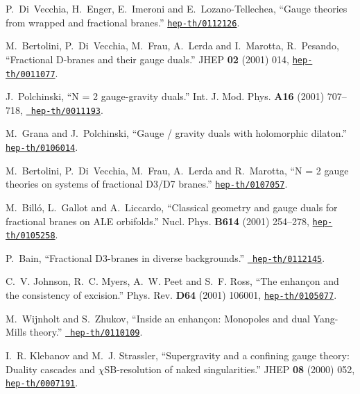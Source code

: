 \documentclass[a4paper,11pt]{article}
\begin{document}
\begin{thebibliography}{10}
P.~Di~Vecchia, H.~Enger, E.~Imeroni and E.~Lozano-Tellechea, ``Gauge theories
  from wrapped and fractional branes.''
  \href{http://xxx.lanl.gov/abs/hep-th/0112126}{{\tt hep-th/0112126}}.

M.~Bertolini, P.~Di~Vecchia, M.~Frau, A.~Lerda and I.~Marotta, R.~Pesando,
  ``Fractional D-branes and their gauge duals.'' JHEP {\bf 02} (2001) 014,
  \href{http://xxx.lanl.gov/abs/hep-th/0011077}{{\tt hep-th/0011077}}.

J.~Polchinski, ``N = 2 gauge-gravity duals.'' Int. J. Mod. Phys. {\bf A16}
  (2001) 707--718, \href{http://xxx.lanl.gov/abs/hep-th/0011193}{{\tt
  hep-th/0011193}}. %

M.~Grana and J.~Polchinski, ``Gauge / gravity duals with holomorphic dilaton.''
  \href{http://xxx.lanl.gov/abs/hep-th/0106014}{{\tt hep-th/0106014}}.

M.~Bertolini, P.~Di~Vecchia, M.~Frau, A.~Lerda and R.~Marotta, ``N = 2 gauge
  theories on systems of fractional D3/D7 branes.''
  \href{http://xxx.lanl.gov/abs/hep-th/0107057}{{\tt hep-th/0107057}}.

M.~Bill\'o, L.~Gallot and A.~Liccardo, ``Classical geometry and gauge duals for
  fractional branes on ALE orbifolds.'' Nucl. Phys. {\bf B614} (2001) 254--278,
  \href{http://xxx.lanl.gov/abs/hep-th/0105258}{{\tt hep-th/0105258}}.

P.~Bain, ``Fractional D3-branes in diverse backgrounds.''
  \href{http://xxx.lanl.gov/abs/http://arXiv.org/abs/hep-th/0112145}{{\tt
  hep-th/0112145}}. %

C.~V. Johnson, R.~C. Myers, A.~W. Peet and S.~F. Ross, ``The enhan\c{c}on and
  the consistency of excision.'' Phys. Rev. {\bf D64} (2001) 106001,
  \href{http://xxx.lanl.gov/abs/hep-th/0105077}{{\tt hep-th/0105077}}.

M.~Wijnholt and S.~Zhukov, ``Inside an enhan\c{c}on: Monopoles and dual
  {Yang-Mills} theory.'' \href{http://xxx.lanl.gov/abs/hep-th/0110109}{{\tt
  hep-th/0110109}}. %

I.~R. Klebanov and M.~J. Strassler, ``Supergravity and a confining gauge
  theory: Duality cascades and {$\chi$}{SB}-resolution of naked
  singularities.'' JHEP {\bf 08} (2000) 052,
  \href{http://xxx.lanl.gov/abs/hep-th/0007191}{{\tt hep-th/0007191}}.


\end{thebibliography}
\end{document}
